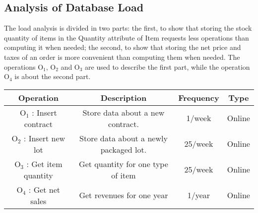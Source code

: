 \newpage
\subsection{Analysis of Database Load}
The load analysis is divided in two parts: the first, to show that storing the stock quantity of items in the Quantity attribute of Item requests less operations than computing it when needed; the second, to show that storing the net price and taxes of an order is more convenient than computing them when needed.
The operations $ \textrm{O}_\textrm{1} $, $ \textrm{O}_\textrm{2} $ and $ \textrm{O}_\textrm{3} $ are used to describe the first part, while the operation $ \textrm{O}_\textrm{4} $ is about the second part.

\begin{table}[!h]
	\begin{center}
		\begin{tabular}{ | c | c | c | c | }
			\hline
			\textbf{Operation} & \textbf{Description} & \textbf{Frequency} & \textbf{Type} \\ \hline
			$ \textrm{O}_\textrm{1} $ : Insert contract & Store data about a new contract. & 1/week & Online \\ \hline
			$ \textrm{O}_\textrm{2} $ : Insert new lot & Store data about a newly packaged lot. & 25/week & Online \\ \hline
			$ \textrm{O}_\textrm{3} $ : Get item quantity  & Get quantity for one type of item & 25/week & Online \\\hline
			$ \textrm{O}_\textrm{4} $ : Get net sales  & Get revenues for one year & 1/year & Online \\\hline
		\end{tabular}
	\end{center}
\end{table}


